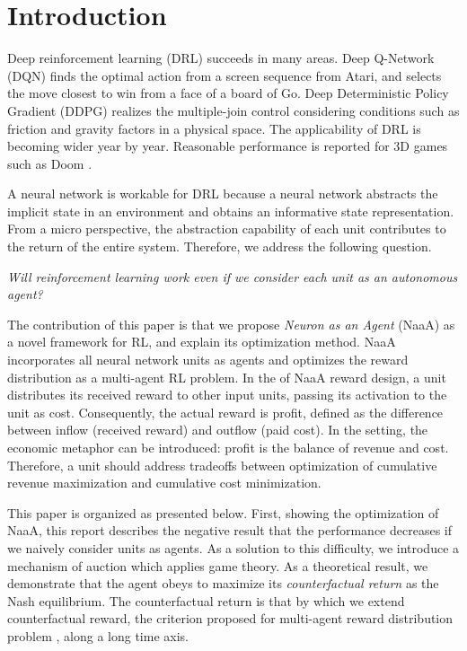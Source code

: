 \section{Introduction}
Deep reinforcement learning (DRL) succeeds in many areas.
Deep Q-Network (DQN) \citep{mnih2015human,silver2016mastering} finds the optimal action from a screen sequence from Atari, and selects the move closest to win from a face of a board of Go.
Deep Deterministic Policy Gradient (DDPG) \citep{lillicrap2015continuous} realizes the multiple-join control considering conditions such as friction and gravity factors in a physical space.
The applicability of DRL is becoming wider year by year. Reasonable performance is reported for 3D games such as Doom \citep{dosovitskiy2016learning}.

A neural network is workable for DRL because a neural network abstracts the implicit state in an environment and obtains an informative state representation.
From a micro perspective, the abstraction capability of each unit contributes to the return of the entire system.
Therefore, we address the following question.

\begin{center}
{\em Will reinforcement learning work even if we consider each unit as an autonomous agent?}
\end{center}

The contribution of this paper is that we propose {\em Neuron as an Agent} (NaaA) as a novel framework for RL, and explain its optimization method.
NaaA incorporates all neural network units as agents and optimizes the reward distribution as a multi-agent RL problem.
In the of NaaA reward design, a unit distributes its received reward to other input units, passing its activation to the unit as cost.
Consequently, the actual reward is profit, defined as the difference between inflow (received reward) and outflow (paid cost).
In the setting, the economic metaphor can be introduced: profit is the balance of revenue and cost. 
Therefore, a unit should address tradeoffs between optimization of cumulative revenue maximization and cumulative cost minimization.

This paper is organized as presented below.
First, showing the optimization of NaaA, this report describes the negative result that the performance decreases if we naively consider units as agents.
As a solution to this difficulty, we introduce a mechanism of auction which applies game theory.
As a theoretical result, we demonstrate that the agent obeys to maximize its {\em counterfactual return} as the Nash equilibrium.
The counterfactual return is that by which we extend counterfactual reward, the criterion proposed for multi-agent reward distribution problem \citep{agogino2006quicr}, along a long time axis.

